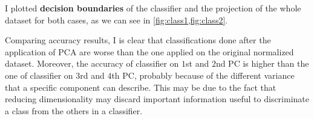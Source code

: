 \documentclass[a4paper, 11pt]{article}
\begin{document}
	I plotted \textbf{decision boundaries} of the classifier and the projection of the whole dataset for both cases, as we can see in \vref{fig:class1,fig:class2}.
	
	
	Comparing accuracy results, I is clear that classifications done after the application of PCA are worse than the one applied on the original normalized dataset. Moreover, the accuracy of classifier on $1$st and $2$nd PC is higher than the one of classifier on $3$rd and $4$th PC, probably because of the different variance that a specific component can describe.
	This may be due to the fact that reducing dimensionality may discard important information useful to discriminate a class from the others in a classifier.
	
	
\end{document}

